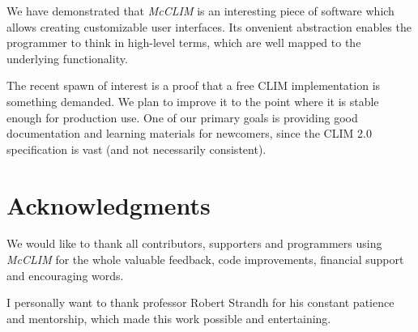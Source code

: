 \documentclass{sig-alternate-05-2015}
\begin{document}
We have demonstrated that \emph{McCLIM} is an interesting piece of
software which allows creating customizable user
interfaces. Its onvenient abstraction enables the programmer to think in
high-level terms, which are well mapped to the underlying
functionality.

The recent spawn of interest is a proof that a free CLIM implementation is
something demanded. We plan to improve it to the point where it is
stable enough for production use. One of our primary goals is
providing good documentation and learning materials for newcomers,
since the CLIM 2.0 specification is vast (and not necessarily consistent).

\section{Acknowledgments}

We would like to thank all contributors, supporters and
programmers using \emph{McCLIM} for the whole valuable feedback, code
improvements, financial support and encouraging words.

I personally want to thank professor Robert Strandh for his constant
patience and mentorship, which made this work possible and
entertaining.



\end{document}
